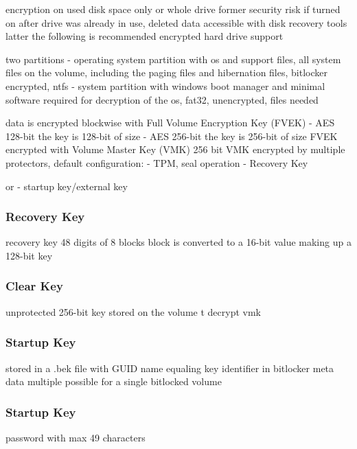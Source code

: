 encryption on used disk space only or whole drive
former security risk if turned on after drive was already in use, deleted data accessible with disk recovery tools
latter the following is recommended
encrypted hard drive support

two partitions
- operating system partition with os and support files, all system files on the volume, including the paging files and hibernation files, bitlocker encrypted, ntfs
- system partition with windows boot manager and minimal software required for decryption of the os, fat32, unencrypted, files needed

data is encrypted blockwise with Full Volume Encryption Key (FVEK)
- AES 128-bit the key is 128-bit of size
- AES 256-bit the key is 256-bit of size
FVEK encrypted with Volume Master Key (VMK) 256 bit
VMK encrypted by multiple protectors, default configuration:
- TPM, seal operation
- Recovery Key

or
- startup key/external key

\subsubsection{Recovery Key}
recovery key 48 digits of 8 blocks
block is converted to a 16-bit value making up a 128-bit key

\subsubsection{Clear Key}
unprotected 256-bit key stored on the volume t decrypt vmk

\subsubsection{Startup Key}
stored in a .bek file with GUID name equaling key identifier in bitlocker meta data
multiple possible for a single bitlocked volume

\subsubsection{Startup Key}
password with max 49 characters